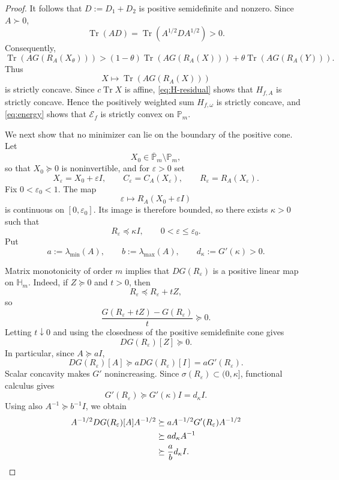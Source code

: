 \documentclass[11pt]{amsart}
\theoremstyle{definition}
\theoremstyle{remark}
\newcommand{\Pm}{\mathbb P_m}
\newcommand{\Tr}{\operatorname{Tr}}
\begin{document}
\begin{proof}
		It follows that $D:=D_1+D_2$ is positive semidefinite and nonzero.
		Since $A\succ0$,
		\[
		\Tr(AD)
		=\Tr\!\left(A^{1/2}DA^{1/2}\right)>0.
		\]
		Consequently,
		\[
		\Tr\!\left(AG(R_A(X_\theta))\right)
		>
		(1-\theta)\Tr\!\left(AG(R_A(X))\right)
		+\theta\Tr\!\left(AG(R_A(Y))\right).
		\]
		Thus
		\[
		X\longmapsto\Tr\!\left(AG(R_A(X))\right)
		\]
		is strictly concave.  Since $c\Tr X$ is affine,
		\eqref{eq:H-residual} shows that $H_{f,A}$ is strictly concave.
		Hence the positively weighted sum $H_{f,\omega}$ is strictly concave,
		and \eqref{eq:energy} shows that $\mathcal E_f$ is strictly convex
		on $\Pm$.
		
		We next show that no minimizer can lie on the boundary of the positive
		cone.  Let
		\[
		X_0\in\overline{\mathbb{P}}_m\setminus\Pm,
		\]
		so that $X_0\succeq0$ is noninvertible, and for $\varepsilon>0$ set
		\[
		X_\varepsilon=X_0+\varepsilon I,
		\qquad
		C_\varepsilon=C_A(X_\varepsilon),
		\qquad
		R_\varepsilon=R_A(X_\varepsilon).
		\]
		Fix $0<\varepsilon_0<1$.  The map
		\[
		\varepsilon\longmapsto R_A(X_0+\varepsilon I)
		\]
		is continuous on $[0,\varepsilon_0]$.  Its image is therefore
		bounded, so there exists $\kappa>0$ such that
		\[
		R_\varepsilon\preceq\kappa I,
		\qquad 0<\varepsilon\le\varepsilon_0.
		\]
		Put
		\[
		a:=\lambda_{\min}(A),
		\qquad
		b:=\lambda_{\max}(A),
		\qquad
		d_\kappa:=G'(\kappa)>0.
		\]
		
		Matrix monotonicity of order $m$ implies that
		$DG(R_\varepsilon)$ is a positive linear map on $\mathbb H_m$.
		Indeed, if $Z\succeq0$ and $t>0$, then
		\[
		R_\varepsilon\preceq R_\varepsilon+tZ,
		\]
		so
		\[
		\frac{G(R_\varepsilon+tZ)-G(R_\varepsilon)}{t}\succeq0.
		\]
		Letting $t\downarrow0$ and using the closedness of the positive
		semidefinite cone gives
		\[
		DG(R_\varepsilon)[Z]\succeq0.
		\]
		In particular, since $A\succeq aI$,
		\[
		DG(R_\varepsilon)[A]
		\succeq aDG(R_\varepsilon)[I]
		=aG'(R_\varepsilon).
		\]
		Scalar concavity makes $G'$ nonincreasing.  Since
		$\sigma(R_\varepsilon)\subset(0,\kappa]$, functional calculus gives
		\[
		G'(R_\varepsilon)\succeq G'(\kappa)I=d_\kappa I.
		\]
		Using also $A^{-1}\succeq b^{-1}I$, we obtain
		\begin{align}
			A^{-1/2}DG(R_\varepsilon)[A]A^{-1/2}
			&\succeq
			aA^{-1/2}G'(R_\varepsilon)A^{-1/2} \notag\\
			&\succeq
			ad_\kappa A^{-1} \notag\\
			&\succeq
			\frac{a}{b}d_\kappa I.
			\label{eq:DG-lower-bound}
		\end{align}
		

\end{proof}
\end{document}
